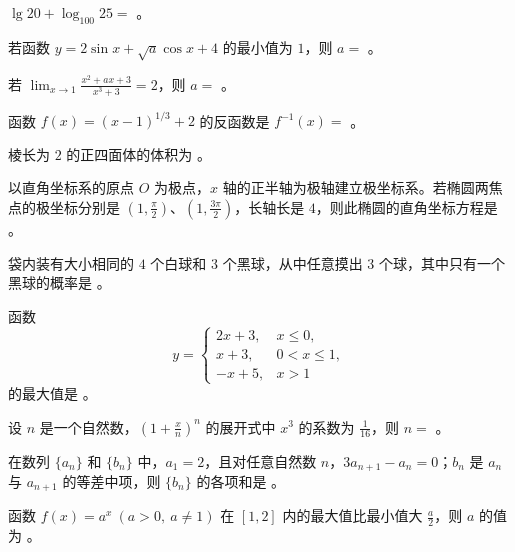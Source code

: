 \begin{question}
$\lg 20+\log_{100}25=$ \gkblank{}。

\end{question}
\begin{question}
若函数 $y=2\sin x+\sqrt a\cos x+4$ 的最小值为 $1$，则 $a=$ \gkblank{}。

\end{question}
\begin{question}
若 $\displaystyle\lim_{x\to1}\frac{x^2+ax+3}{x^3+3}=2$，则 $a=$ \gkblank{}。

\end{question}
\begin{question}
函数 $f(x)=(x-1)^{1/3}+2$ 的反函数是 $f^{-1}(x)=$ \gkblank{}。

\end{question}
\begin{question}
棱长为 $2$ 的正四面体的体积为 \gkblank{}。

\end{question}
\begin{question}
以直角坐标系的原点 $O$ 为极点，$x$ 轴的正半轴为极轴建立极坐标系。若椭圆两焦点的极坐标分别是 $(1,\frac\pi2)$、$(1,\frac{3\pi}2)$，长轴长是 $4$，则此椭圆的直角坐标方程是 \gkblank{}。

\end{question}
\begin{question}
袋内装有大小相同的 $4$ 个白球和 $3$ 个黑球，从中任意摸出 $3$ 个球，其中只有一个黑球的概率是 \gkblank{}。

\end{question}
\begin{question}
函数
\nopagebreak[4]
\[
y=\begin{cases}
2x+3,&x\le 0,\\
x+3,&0<x\le 1,\\
-x+5,&x>1
\end{cases}
\]
的最大值是 \gkblank{}。

\end{question}
\begin{question}
设 $n$ 是一个自然数，$\left(1+\frac{x}{n}\right)^n$ 的展开式中 $x^3$ 的系数为 $\frac1{16}$，则 $n=$ \gkblank{}。

\end{question}
\begin{question}
在数列 $\{a_n\}$ 和 $\{b_n\}$ 中，$a_1=2$，且对任意自然数 $n$，$3a_{n+1}-a_n=0$；$b_n$ 是 $a_n$ 与 $a_{n+1}$ 的等差中项，则 $\{b_n\}$ 的各项和是 \gkblank{}。

\end{question}
\begin{question}
函数 $f(x)=a^x\ (a>0,\ a\ne1)$ 在 $[1,2]$ 内的最大值比最小值大 $\frac a2$，则 $a$ 的值为 \gkblank{}。

\end{question}


